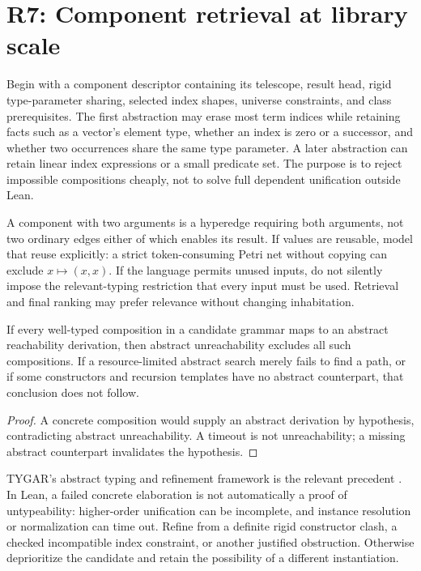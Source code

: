 \section{R7: Component retrieval at library scale}\label{sec:r7}


Begin with a component descriptor containing its telescope, result head,
rigid type-parameter sharing, selected index shapes, universe constraints, and
class prerequisites. The first abstraction may erase most term indices while
retaining facts such as a vector's element type, whether an index is zero or
a successor, and whether two occurrences share the same type parameter. A
later abstraction can retain linear index expressions or a small predicate
set. The purpose is to reject impossible compositions cheaply, not to solve
full dependent unification outside Lean.

A component with two arguments is a hyperedge requiring both arguments, not
two ordinary edges either of which enables its result. If values are reusable,
model that reuse explicitly: a strict token-consuming Petri net without copying
can exclude $x\mapsto(x,x)$. If the language permits unused inputs, do not
silently impose the relevant-typing restriction that every input must be used.
Retrieval and final ranking may prefer relevance without changing inhabitation.

\begin{proposition}\label{prop:retrieval}
If every well-typed composition in a candidate grammar maps to an abstract
reachability derivation, then abstract unreachability excludes all such
compositions. If a resource-limited abstract search merely fails to find a
path, or if some constructors and recursion templates have no abstract
counterpart, that conclusion does not follow.
\end{proposition}
\begin{proof}
A concrete composition would supply an abstract derivation by hypothesis,
contradicting abstract unreachability. A timeout is not unreachability; a
missing abstract counterpart invalidates the hypothesis.
\end{proof}

TYGAR's abstract typing and refinement framework is the relevant precedent
\cite{hoogleplus}. In Lean, a failed concrete elaboration is not automatically
a proof of untypeability: higher-order unification can be incomplete, and
instance resolution or normalization can time out. Refine from a definite
rigid constructor clash, a checked incompatible index constraint, or another
justified obstruction. Otherwise deprioritize the candidate and retain the
possibility of a different instantiation.

